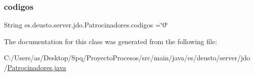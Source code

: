 \subsubsection{\texorpdfstring{codigos}{codigos}}
{\footnotesize\ttfamily String es.\+deusto.\+server.\+jdo.\+Patrocinadores.\+codigos =\char`\"{}0\char`\"{}\hspace{0.3cm}{\ttfamily [static]}}



The documentation for this class was generated from the following file\+:\begin{DoxyCompactItemize}
\item 
C\+:/\+Users/as/\+Desktop/\+Spq/\+Proyecto\+Procesos/src/main/java/es/deusto/server/jdo/\mbox{\hyperlink{_patrocinadores_8java}{Patrocinadores.\+java}}\end{DoxyCompactItemize}
